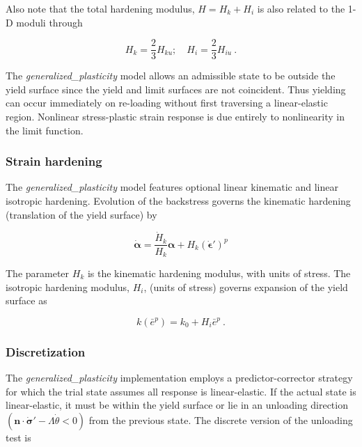 \documentclass[11pt]{report}
\numberwithin{equation}{section}
\newcommand{\bmf } {\boldsymbol }
\begin{document}
Also note that the total hardening modulus, $H=H_k + H_i$ is also
related to the 1-D moduli through

\begin{equation}
{H_k} = \textstyle \frac{2}{3} \displaystyle {H_{ku}};\quad {H_i} =
\textstyle  \frac{2}{3} \displaystyle {H_{iu}}~.
\end{equation}

The \textit{generalized\_plasticity} model allows an admissible state to be 
outside the yield surface since the yield and limit surfaces are not coincident.  
Thus yielding can occur immediately on re-loading without first traversing 
a linear-elastic region.  Nonlinear stress-plastic strain response is due 
entirely to nonlinearity in the limit function.

\subsubsection{Strain hardening} %
The \textit{generalized\_plasticity} model features optional 
linear kinematic and linear isotropic hardening. Evolution of the backstress 
governs the kinematic hardening (translation of the yield surface) by 

\begin{equation}
{\dot{\bmf \alpha }} = \dfrac{\dot{H}_{k}}{H_{k}}\boldsymbol{\alpha} + 
{H_k}{\left( \dot {\bmf{\epsilon}}' \right)^p}
\end{equation}

The parameter $H_k$  is the kinematic hardening modulus, with units of stress.  
The isotropic hardening modulus, $H_i$, (units of stress) governs 
expansion of the yield surface as

\begin{equation}
k( \bar e^p ) = k_0 + H_i \bar e^p ~.
\end{equation}


\subsubsection {Discretization}
The \textit{generalized\_plasticity} implementation employs a predictor-corrector 
strategy for which the trial state assumes all response is linear-elastic. If the 
actual state is linear-elastic, it must be within the yield surface or lie in 
an unloading direction 
$\left( \bmf n \cdot \dot {\bmf {\sigma}}'-\Lambda \dot{\theta} <0\right)$ from 
the previous state.  The discrete version of the unloading test is 
\end{document}
